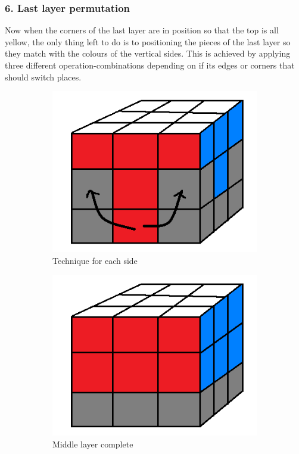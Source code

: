 \documentclass[a4paper,11pt]{kth-mag}
\begin{document}
\subsubsection{6. Last layer permutation}
Now when the corners of the last layer are in position so that the top is all yellow, the only thing left to do is to positioning the pieces of the last layer so they match with the colours of the vertical sides. This is achieved by applying three different operation-combinations depending on if its edges or corners that should switch places. 
\begin{figure}[h]
	\centering
	\begin{subfigure}[!b]{0.3\textwidth}
		\includegraphics[width=\textwidth]{figs/step32.png}
		\caption{Technique for each side}
		\label{fig_6}
	\end{subfigure}
	\begin{subfigure}[!b]{0.3\textwidth}
		\includegraphics[width=\textwidth]{figs/step31.png}
		\caption{Middle layer complete}
		\label{fig_7}
	\end{subfigure}\caption{}
\end{figure}
\end{document}
